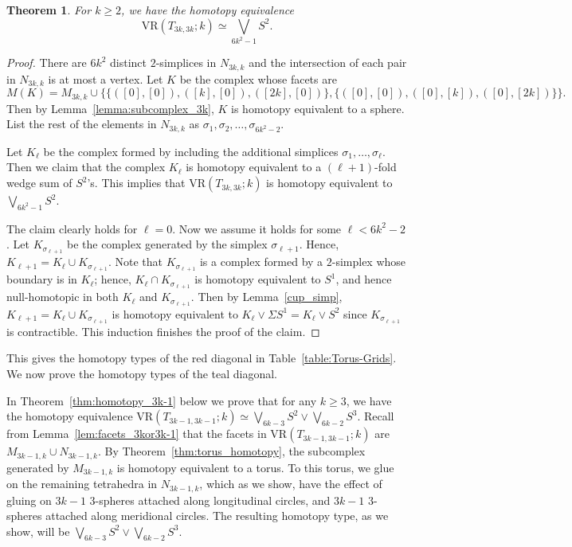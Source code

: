 \documentclass[12pt,a4paper]{amsart}
\newtheorem{theorem}{Theorem}[section]
\theoremstyle{definition}
\newcommand{\vr}[2]{\mathrm{VR}(#1;#2)}
\numberwithin{equation}{section}
\begin{document}
\begin{theorem}
\label{thm:homotopy_3k}
For $k\geq 2$, we have the homotopy equivalence
\[\vr{T_{3k,3k}}{k}\simeq \bigvee_{6k^2-1} S^2.\]
\end{theorem}

\begin{proof}
There are $6k^2$ distinct $2$-simplices in $N_{3k,k}$ and the intersection of each pair in $N_{3k,k}$ is at most a vertex.
Let $K$ be the complex whose facets are
\[M(K) = M_{3k,k}\cup \{\{([0], [0]), ([k], [0]), ([2k], [0]) \}, \{([0], [0]), ([0], [k]), ([0], [2k])\}\}.\]
Then by Lemma~\ref{lemma:subcomplex_3k}, $K$ is homotopy equivalent to a sphere.
List the rest of the elements in $N_{3k,k}$ as $\sigma_1, \sigma_2, \ldots, \sigma_{6k^2-2}$.

Let $K_\ell$ be the complex formed by including the additional simplices $\sigma_1, \ldots, \sigma_\ell$.
Then we claim that the complex $K_\ell$ is homotopy equivalent to a $(\ell+1)$-fold wedge sum of $S^2$'s.
This implies that $\vr{T_{3k,3k}}{k}$ is homotopy equivalent to $\bigvee_{6k^2-1} S^2$.

The claim clearly holds for $\ell=0$.
Now we assume it holds for some $\ell<6k^2-2$.
Let $K_{\sigma_{\ell+1}}$ be the complex generated by the simplex $\sigma_{\ell+1}$.
Hence, $K_{\ell+1} =K_\ell\cup K_{\sigma_{\ell+1}}$.
Note that $K_{\sigma_{\ell+1}}$ is a complex formed by a $2$-simplex whose boundary is in $K_\ell$; hence, $K_\ell\cap K_{\sigma_{\ell+1}}$ is homotopy equivalent to $S^1$, and hence null-homotopic in both $K_\ell$ and $K_{\sigma_{\ell+1}}$.
Then by Lemma~\ref{cup_simp}, $K_{\ell+1} =K_\ell\cup K_{\sigma_{\ell+1}}$ is homotopy equivalent to $K_\ell\vee \Sigma S^1 = K_\ell\vee S^2$ since $K_{\sigma_{\ell+1}}$ is contractible.
This induction finishes the proof of the claim.
\end{proof}

This gives the homotopy types of the \colorbox{purple!60}{red} diagonal in Table~\ref{table:Torus-Grids}.
We now prove the homotopy types of the \colorbox{teal!50}{teal} diagonal.

In Theorem~\ref{thm:homotopy_3k-1} below we prove that for any $k\geq 3$, we have the homotopy equivalence $\vr{T_{3k-1,3k-1}}{k}\simeq \bigvee_{6k-3} S^2\vee \bigvee_{6k-2}S^3$.
Recall from Lemma~\ref{lem:facets_3kor3k-1} that the facets in $\vr{T_{3k-1,3k-1}}{k}$ are $M_{3k-1,k}\cup N_{3k-1,k}$.
By Theorem~\ref{thm:torus_homotopy}, the subcomplex generated by $M_{3k-1,k}$ is homotopy equivalent to a torus.
To this torus, we glue on the remaining tetrahedra in $N_{3k-1,k}$, which as we show, have the effect of gluing on $3k-1$ $3$-spheres attached along longitudinal circles, and $3k-1$ $3$-spheres attached along meridional circles.
The resulting homotopy type, as we show, will be $\bigvee_{6k-3} S^2\vee \bigvee_{6k-2}S^3$.
\end{document}
